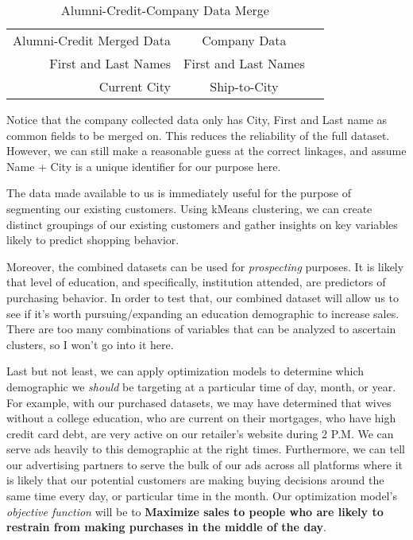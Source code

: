 \documentclass[letterpaper,12pt]{article}
\begin{document}
\begin{table}
  \caption{Alumni-Credit-Company Data Merge}
  \centering
  \begin{tabular}{ |r|c|c|}
    \multicolumn{1}{c}{Alumni-Credit Merged Data}
    &  \multicolumn{1}{c}{Company Data} \\
    \cline{1-2}
    First and Last Names & First and Last Names \\
    \cline{1-2}
    Current City & Ship-to-City \\
    \cline{1-2}
  \end{tabular}
\end{table}

Notice that the company collected data only has City, First and Last name as common fields to be merged on.  This reduces the reliability of the full dataset.  However, we can still make a reasonable guess at the correct linkages, and assume Name + City is a unique identifier for our purpose here.

The data made available to us is immediately useful for the purpose of segmenting our existing customers.  Using kMeans clustering, we can create distinct groupings of our existing customers and gather insights on key variables likely to predict shopping behavior.

Moreover, the combined datasets can be used for \emph{prospecting} purposes.  It is likely that level of education, and specifically, institution attended, are predictors of purchasing behavior.  In order to test that, our combined dataset will allow us to see if it's worth pursuing/expanding an education demographic to increase sales.  There are too many combinations of variables that can be analyzed to ascertain clusters, so I won't go into it here.

Last but not least, we can apply optimization models to determine which demographic we \emph{should} be targeting at a particular time of day, month, or year.  For example, with our purchased datasets, we may have determined that wives without a college education, who are current on their mortgages, who have high credit card debt, are very active on our retailer's website during 2 P.M.  We can serve ads heavily to this demographic at the right times.  Furthermore, we can tell our advertising partners to serve the bulk of our ads across all platforms where it is likely that our potential customers are making buying decisions around the same time every day, or particular time in the month.  Our optimization model's \emph{objective function} will be to \textbf{Maximize sales to people who are likely to restrain from making purchases in the middle of the day}.  
\end{document}
